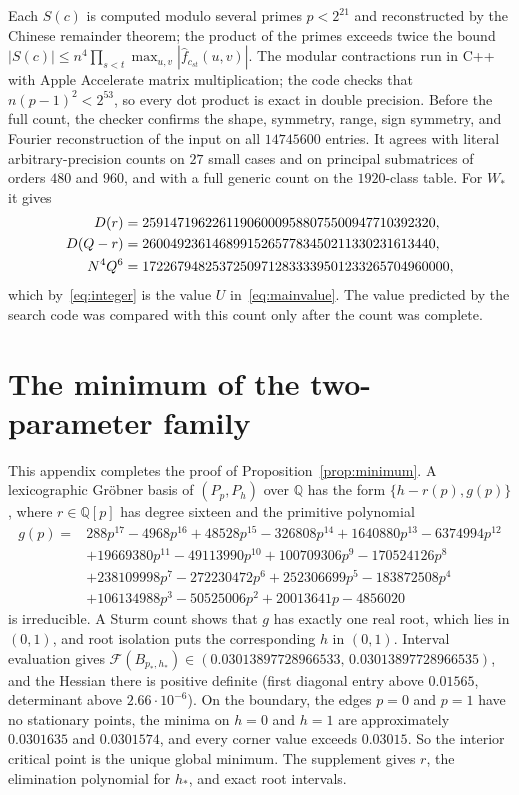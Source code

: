 \documentclass[11pt]{article}
\theoremstyle{definition}
\theoremstyle{remark}
\newcommand{\F}{\mathcal F}
\newcommand{\Q}{\mathbb Q}
\begin{document}
Each $S(c)$ is computed modulo several primes $p<2^{21}$ and reconstructed by the Chinese remainder theorem; the product of the primes exceeds twice the bound $|S(c)|\le n^4\prod_{s<t}\max_{u,v}|\widehat f_{c_{st}}(u,v)|$.
The modular contractions run in C++ with Apple Accelerate matrix multiplication; the code checks that $n(p-1)^2<2^{53}$, so every dot product is exact in double precision.
Before the full count, the checker confirms the shape, symmetry, range, sign symmetry, and Fourier reconstruction of the input on all $14745600$ entries.
It agrees with literal arbitrary-precision counts on $27$ small cases and on principal submatrices of orders $480$ and $960$, and with a full generic count on the $1920$-class table.
For $W_*$ it gives
\begin{align}
\label{eq:rawcounts}
 D(r)&=259147196226119060009588075500947710392320,\notag\\
 D(Q-r)&=260049236146899152657783450211330231613440,\notag\\
 N^4Q^6&=17226794825372509712833339501233265704960000,
\end{align}
which by~\eqref{eq:integer} is the value $U$ in~\eqref{eq:mainvalue}.
The value predicted by the search code was compared with this count only after the count was complete.

\section{The minimum of the two-parameter family}
\label{app:minimum}

This appendix completes the proof of Proposition~\ref{prop:minimum}.
A lexicographic Gr\"obner basis of $(P_p,P_h)$ over $\Q$ has the form $\{h-r(p),g(p)\}$, where $r\in\Q[p]$ has degree sixteen and the primitive polynomial
\begin{align*}
g(p)={}&288p^{17}-4968p^{16}+48528p^{15}-326808p^{14}+1640880p^{13}-6374994p^{12}\\
 &+19669380p^{11}-49113990p^{10}+100709306p^9-170524126p^8\\
 &+238109998p^7-272230472p^6+252306699p^5-183872508p^4\\
 &+106134988p^3-50525006p^2+20013641p-4856020
\end{align*}
is irreducible.
A Sturm count shows that $g$ has exactly one real root, which lies in $(0,1)$, and root isolation puts the corresponding $h$ in $(0,1)$.
Interval evaluation gives $\F(B_{p_*,h_*})\in(0.03013897728966533,\,0.03013897728966535)$, and the Hessian there is positive definite (first diagonal entry above $0.01565$, determinant above $2.66\cdot10^{-6}$).
On the boundary, the edges $p=0$ and $p=1$ have no stationary points, the minima on $h=0$ and $h=1$ are approximately $0.0301635$ and $0.0301574$, and every corner value exceeds $0.03015$.
So the interior critical point is the unique global minimum.
The supplement gives $r$, the elimination polynomial for $h_*$, and exact root intervals.



\end{document}
